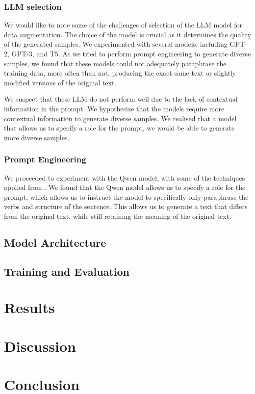 \documentclass{article}
\begin{document}
\subsubsection{LLM selection}

We would like to note some of the challenges of selection of the LLM model for
data augmentation. The choice of the model is crucial as it determines the
quality of the generated samples. We experimented with several models,
including GPT-2, GPT-3, and T5. As we tried to perform prompt engineering to
generate diverse samples, we found that these models could not adequately
paraphrase the training data, more often than not, producing the exact same
text or slightly modified versions of the original text.

We suspect that these LLM do not perform well due to the lack of contextual
information in the prompt. We hypothesize that the models require more
contextual information to generate diverse samples. We realised that a model
that allows us to specify a role for the prompt, we would be able to generate
more diverse samples.

\subsubsection{Prompt Engineering}

We proceeded to experiment with the Qwen model, with some of the techniques
applied from \cite{promptingguide}. We found that the Qwen model allows us to
specify a role for the prompt, which allows us to instruct the model to
specifically only paraphrase the verbs and structure of the sentence. This
allows us to generate a text that differs from the original text, while still
retaining the meaning of the original text.

\subsection{Model Architecture}

\subsection{Training and Evaluation}

\section{Results}

\section{Discussion}

\section{Conclusion}



\end{document}
